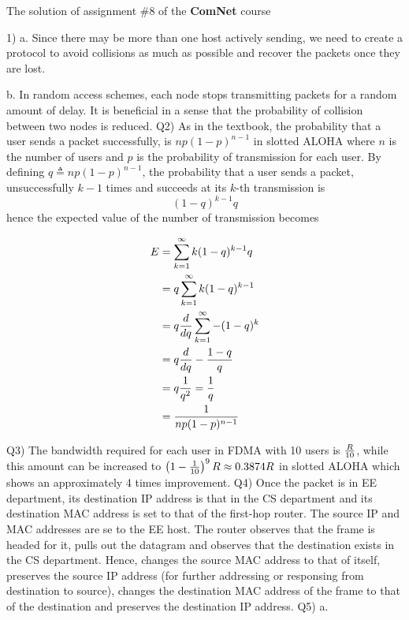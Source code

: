 \documentclass[10pt,letterpaper]{article}
\newcommand{\eqn}[2]{
\begin{equation}
\begin{split}
#1
\label{#2}
\end{split}
\end{equation}
}
\begin{document}
\Large
\begin{center}
The solution of assignment \#8 of the \textbf{ComNet} course
\end{center}
1) a. Since there may be more than one host actively sending, we need to create a protocol to avoid collisions as much as possible and recover the packets once they are lost.

b. In random access schemes, each node stops transmitting packets for a random amount of delay. It is beneficial in a sense that the probability of collision between two nodes is reduced.
\newline\newline
Q2) As in the textbook, the probability that a user sends a packet successfully, is $np(1-p)^{n-1}$ in slotted ALOHA where $n$ is the number of users and $p$ is the probability of transmission for each user. By defining $q\triangleq np(1-p)^{n-1}$, the probability that a user sends a packet, unsuccessfully $k-1$ times and succeeds at its $k$-th transmission is 
$$(1-q)^{k-1}q$$
hence the expected value of the number of transmission becomes 
\eqn{
E&=\sum_{k=1}^{\infty}k(1-q)^{k-1}q
\\&=q\sum_{k=1}^{\infty}k(1-q)^{k-1}
\\&=q{d\over dq}\sum_{k=1}^{\infty}-(1-q)^{k}
\\&=q{d\over dq} -{1-q\over q}
\\&=q{1\over q^2}={1\over q}
\\&={1\over np(1-p)^{n-1}}
}{}
Q3) The bandwidth required for each user in FDMA with 10 users is $R\over 10$, while this amount can be increased to $\left({1}-{1\over 10}\right)^{9}R\approx 0.3874 R$ in slotted ALOHA which shows an approximately 4 times improvement.
\newline\newline
Q4) Once the packet is in EE department, its destination IP address is that in the CS department and its destination MAC address is set to that of the first-hop router. The source IP and MAC addresses are se to the EE host. The router observes that the frame is headed for it, pulls out the datagram and observes that the destination exists in the CS department. Hence, changes the source MAC address to that of itself, preserves the source IP address (for further addressing or responsing from destination to source), changes the destination MAC address of the frame to that of the destination and preserves the destination IP address.
\newline\newline
Q5)
a.
\end{document}
